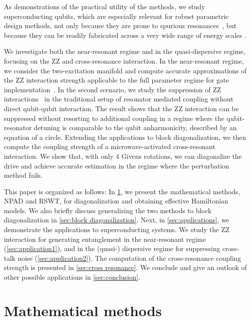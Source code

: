 \documentclass[%
 reprint,
 amsmath,amssymb,
 aps,
pra,
noeprint,
superscriptaddress,
]{revtex4-2}
\begin{document}
As demonstrations of the practical utility of the methods, we study superconducting qubits, which are especially relevant for robust parametric design methods, not only because they are prone to spurious resonances~\cite{Malekakhlagh2021,Sank2016,Baker2018}, but because they can be readily fabricated across a very wide range of energy scales \cite{krause2021magnetic, forn2010observation}.

We investigate both the near-resonant regime and in the quasi-dispersive regime, focusing on the ZZ and cross-resonance interaction.
In the near-resonant regime,
we consider the two-excitation manifold and compute accurate approximations of the ZZ interaction strength applicable to the full parameter regime for gate implementation~\cite{Dicarlo2009,Chen2014,Barends2014,Rol2019}.
In the second scenario, we study the suppression of ZZ interactions~\cite{Goerz2017,Zhao2020,Ku2020,Xu2020,Sete2021,Xu2020zz,Zhao2020a,Stehlik2021,Sung2020,kandala2021,Mundada2019,Collodo2020,Chu2021,Jin2021,Finck2021,Wei2021,Mitchell2021,Xiong2021} in the traditional setup of resonator mediated coupling without direct qubit-qubit interaction.
The result shows that the ZZ interaction can be suppressed without resorting to additional coupling in a regime where the qubit-resonator detuning is comparable to the qubit anharmonicity, described by an equation of a circle.
Extending the applications to block diagonalization, we then compute the coupling strength of a microwave-activated cross-resonant interaction.
We show that, with only 4 Givens rotations, we can diagonalize the drive and  achieve accurate estimation in the regime where the perturbation method fails.

This paper is organized as follows:
In \cref{sec:methods}, we present the mathematical methods, NPAD and RSWT, for diagonalization and obtaining effective Hamiltonian models.
We also briefly discuss generalizing the two methods to block diagonalization in \cref{sec:block diagonalization}.
Next, in \cref{sec:applications}, we demonstrate the applications to superconducting systems.
We study the ZZ interaction for generating entanglement in the near-resonant regime (\cref{sec:application1}), and in the (quasi-) dispersive regime for suppressing cross-talk noise (\cref{sec:application2}).
The computation of the cross-resonance coupling strength is presented in \cref{sec:cross resonance}.
We conclude and give an outlook of other possible applications in \cref{sec:conclusion}.

\section{Mathematical methods}
\label{sec:methods}
\end{document}
